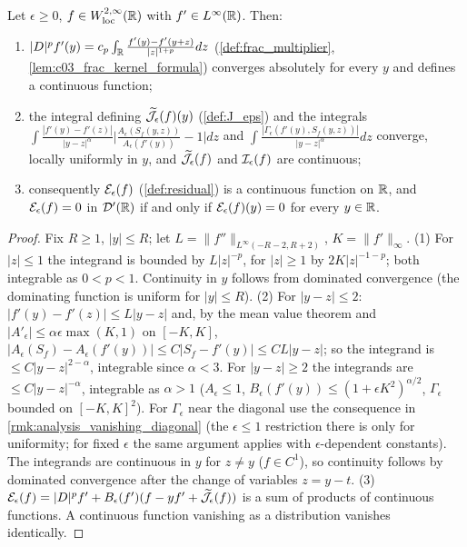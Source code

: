 \begin{lemma}
  \label{lem:c03_I_well_defined}
  Let $\epsilon\ge0$, $f\in W^{2,\infty}_{\textup{loc}}(\mathbb{R})$ with $f'\in L^\infty(\mathbb{R})$. Then:
  \begin{enumerate}
    \item $|D|^pf'(y)=c_p\int_{\mathbb{R}}\frac{f'(y)-f'(y+z)}{|z|^{1+p}}dz$ (\cref{def:frac_multiplier}, \cref{lem:c03_frac_kernel_formula}) converges absolutely for every $y$ and defines a continuous function;
    \item the integral defining $\widetilde{\mathcal{J}}_\epsilon(f)(y)$ (\cref{def:J_eps}) and the integrals
      $\int\frac{|f'(y)-f'(z)|}{|y-z|^\alpha}\bigl|\frac{A_\epsilon(S_f(y,z))}{A_\epsilon(f'(y))}-1\bigr|dz$ and
      $\int\frac{|\Gamma_\epsilon(f'(y),S_f(y,z))|}{|y-z|^\alpha}dz$ converge, locally uniformly in $y$, and
      $\widetilde{\mathcal{J}}_\epsilon(f)$ and $\mathcal{I}_\epsilon(f)$ are continuous;
    \item consequently $\mathcal{E}_\epsilon(f)$ (\cref{def:residual}) is a continuous function on $\mathbb{R}$, and
      $\mathcal{E}_\epsilon(f)=0$ in $\mathcal{D}'(\mathbb{R})$ if and only if $\mathcal{E}_\epsilon(f)(y)=0$ for every $y\in\mathbb{R}$.
  \end{enumerate}
\end{lemma}
\begin{proof}
  Fix $R\ge1$, $|y|\le R$; let $L=\|f''\|_{L^\infty(-R-2,R+2)}$, $K=\|f'\|_\infty$.
  (1) For $|z|\le1$ the integrand is bounded by $L|z|^{-p}$, for $|z|\ge1$ by $2K|z|^{-1-p}$; both integrable as $0<p<1$.
  Continuity in $y$ follows from dominated convergence (the dominating function is uniform for $|y|\le R$).
  (2) For $|y-z|\le2$: $|f'(y)-f'(z)|\le L|y-z|$ and, by the mean value theorem and $|A'_\epsilon|\le\alpha\epsilon\max(K,1)$ on $[-K,K]$,
  $|A_\epsilon(S_f)-A_\epsilon(f'(y))|\le C|S_f-f'(y)|\le CL|y-z|$; so the integrand is $\le C|y-z|^{2-\alpha}$, integrable since $\alpha<3$.
  For $|y-z|\ge2$ the integrands are $\le C|y-z|^{-\alpha}$, integrable as $\alpha>1$ ($A_\epsilon\le1$, $B_\epsilon(f'(y))\le(1+\epsilon K^2)^{\alpha/2}$, $\Gamma_\epsilon$ bounded on $[-K,K]^2$).
  For $\Gamma_\epsilon$ near the diagonal use the consequence in \cref{rmk:analysis_vanishing_diagonal} (the $\epsilon\le 1$ restriction there is only for uniformity; for fixed $\epsilon$ the same argument applies with $\epsilon$-dependent constants).
  The integrands are continuous in $y$ for $z\ne y$ ($f\in C^1$), so continuity follows by dominated convergence after the change of variables $z=y-t$.
  (3) $\mathcal{E}_\epsilon(f)=|D|^pf'+B_\epsilon(f')(f-yf'+\widetilde{\mathcal{J}}_\epsilon(f))$ is a sum of products of continuous functions. A continuous function vanishing as a distribution vanishes identically.
\end{proof}

